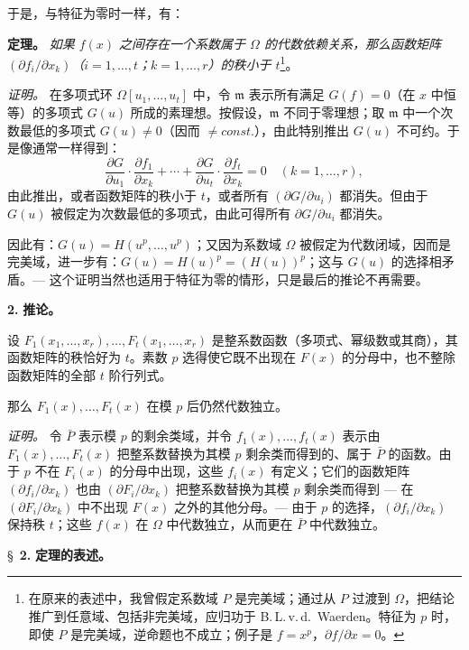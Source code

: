 于是，与特征为零时一样，有：

\noindent\textbf{定理。}
\textit{如果 $f(x)$ 之间存在一个系数属于 $\Omega$ 的代数依赖关系，那么函数矩阵 $(\partial f_i/\partial x_k)$（$i=1,\ldots,t$；$k=1,\ldots,r$）的秩小于 $t$}\footnote{在原来的表述中，我曾假定系数域 $P$ 是完美域；通过从 $P$ 过渡到 $\Omega$，把结论推广到任意域、包括非完美域，应归功于 B.\,L.\,v.\,d.\ Waerden。特征为 $p$ 时，即使 $P$ 是完美域，逆命题也不成立；例子是 $f = x^p$，$\partial f/\partial x = 0$。}。

\noindent\textit{证明。}
在多项式环 $\Omega[u_1,\ldots,u_t]$ 中，令 $\mathfrak{m}$ 表示所有满足 $G(f) = 0$（在 $x$ 中恒等）的多项式 $G(u)$ 所成的素理想。按假设，$\mathfrak{m}$ 不同于零理想；取 $\mathfrak{m}$ 中一个次数最低的多项式 $G(u) \neq 0$（因而 $\neq {const.}$），由此特别推出 $G(u)$ 不可约。于是像通常一样得到：
\[
\frac{\partial G}{\partial u_1} \cdot \frac{\partial f_1}{\partial x_k} + \cdots + \frac{\partial G}{\partial u_t} \cdot \frac{\partial f_t}{\partial x_k} = 0
\quad (k = 1,\ldots,r),
\]
由此推出，或者函数矩阵的秩小于 $t$，或者所有 $(\partial G/\partial u_i)$ 都消失。但由于 $G(u)$ 被假定为次数最低的多项式，由此可得所有 $\partial G/\partial u_i$ 都消失。

因此有：$G(u) = H(u^p,\ldots,u^p)$；又因为系数域 $\Omega$ 被假定为代数闭域，因而是完美域，进一步有：$G(u) = H(u)^p = (H(u))^p$；这与 $G(u)$ 的选择相矛盾。--- 这个证明当然也适用于特征为零的情形，只是最后的推论不再需要。

\medskip\noindent\textbf{2.} \textbf{推论。}

设 $F_1(x_1,\ldots,x_r),\ldots,F_t(x_1,\ldots,x_r)$ 是整系数函数（多项式、幂级数或其商），其函数矩阵的秩恰好为 $t$。素数 $p$ 选得使它既不出现在 $F(x)$ 的分母中，也不整除函数矩阵的全部 $t$ 阶行列式。

那么 $F_1(x),\ldots,F_t(x)$ 在模 $p$ 后仍然代数独立。

\noindent\textit{证明。}
令 $\bar{P}$ 表示模 $p$ 的剩余类域，并令 $f_1(x),\ldots,f_t(x)$ 表示由 $F_1(x),\ldots,F_t(x)$ 把整系数替换为其模 $p$ 剩余类而得到的、属于 $\bar{P}$ 的函数。由于 $p$ 不在 $F_i(x)$ 的分母中出现，这些 $f_i(x)$ 有定义；它们的函数矩阵 $(\partial f_i/\partial x_k)$ 也由 $(\partial F_i/\partial x_k)$ 把整系数替换为其模 $p$ 剩余类而得到 --- 在 $(\partial F_i/\partial x_k)$ 中不出现 $F(x)$ 之外的其他分母。--- 由于 $p$ 的选择，$(\partial f_i/\partial x_k)$ 保持秩 $t$；这些 $f(x)$ 在 $\Omega$ 中代数独立，从而更在 $\bar{P}$ 中代数独立。

\newpage
\S~\textbf{2.}
\textbf{定理的表述。}

\smallskip

